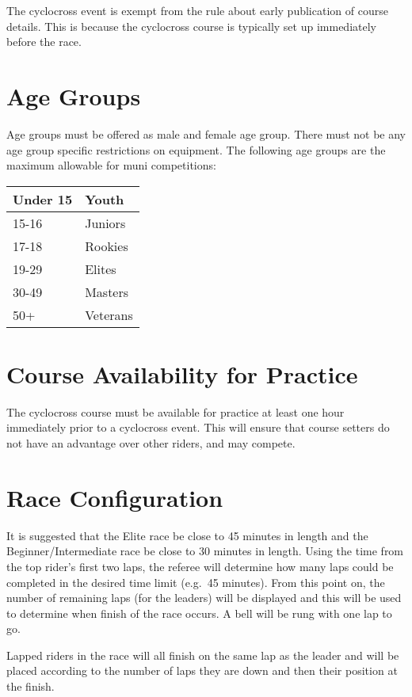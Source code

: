 The cyclocross event is exempt from the rule about early publication of course details.
This is because the cyclocross course is typically set up immediately before the race.

\section{Age Groups}

Age groups must be offered as male and female age group.
There must not be any age group specific restrictions on equipment.
The following age groups are the maximum allowable for muni competitions:

\begin{tabular}{|l|l|}
\hline
Under 15 & Youth \\
\hline
15-16 & Juniors \\
\hline
17-18 & Rookies \\
\hline
19-29 & Elites \\
\hline
30-49 & Masters \\
\hline
50+ & Veterans \\
\hline
\end{tabular}

\section{Course Availability for Practice}

The cyclocross course must be available for practice at least one hour immediately prior to a cyclocross event.
This will ensure that course setters do not have an advantage over other riders, and may compete.

\section{Race Configuration}

It is suggested that the Elite race be close to 45 minutes in length and the Beginner/Intermediate race be close to 30 minutes in length.
Using the time from the top rider's first two laps, the referee will determine how many laps could be completed in the desired time limit (e.g.\ 45 minutes).
From this point on, the number of remaining laps (for the leaders) will be displayed and this will be used to determine when finish of the race occurs.
A bell will be rung with one lap to go.

Lapped riders in the race will all finish on the same lap as the leader and will be placed according to the number of laps they are down and then their position at the finish.

